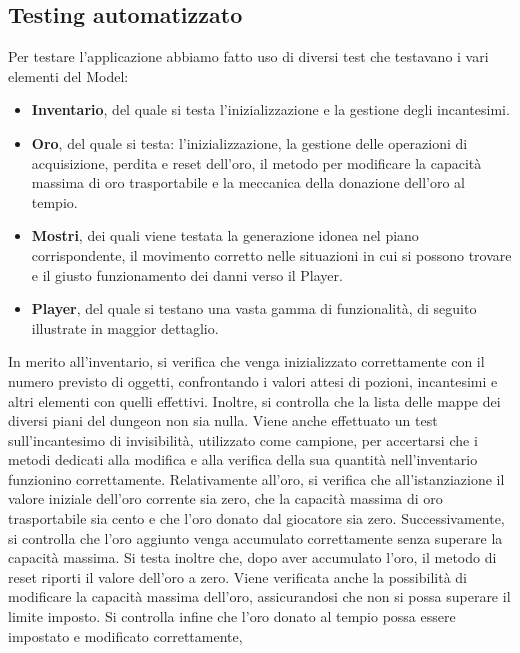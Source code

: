 \documentclass{report}
\begin{document}
\subsection{Testing automatizzato}
Per testare l'applicazione abbiamo fatto uso di diversi test che testavano i vari elementi del Model:
\begin{itemize}
    \item \textbf{Inventario}, del quale si testa l’inizializzazione e la gestione degli incantesimi.
    \item \textbf{Oro}, del quale si testa: l’inizializzazione, la gestione delle operazioni di acquisizione, perdita e reset dell’oro, il metodo per modificare la capacità massima di oro trasportabile e la meccanica della donazione dell’oro al tempio.
    \item \textbf{Mostri}, dei quali viene testata la generazione idonea nel piano corrispondente, il movimento corretto nelle situazioni in cui si possono trovare e il giusto funzionamento dei danni verso il Player.
    \item \textbf{Player}, del quale si testano una vasta gamma di funzionalità, di seguito illustrate in maggior dettaglio.
\end{itemize} 
%
In merito all'inventario, si verifica che venga inizializzato correttamente con il numero previsto di oggetti, confrontando i valori attesi di pozioni, incantesimi e altri elementi con quelli effettivi. Inoltre, si controlla che 
%
la lista delle mappe dei diversi piani del dungeon non sia nulla. \newline
%
Viene anche effettuato un test sull’incantesimo di invisibilità, utilizzato come campione, per accertarsi che i metodi dedicati alla modifica e alla verifica della sua quantità nell’inventario funzionino correttamente. \newline
%
Relativamente all’oro, si verifica che all’istanziazione il valore iniziale dell’oro corrente sia zero, che la capacità massima di oro trasportabile sia cento e che l’oro donato dal giocatore sia zero. Successivamente, 
%
si controlla che l’oro aggiunto venga accumulato correttamente senza superare la capacità massima. Si testa inoltre che, dopo aver accumulato l’oro, il metodo di reset riporti il valore dell’oro a zero. \newline
%
Viene verificata anche la possibilità di modificare la capacità massima dell’oro, assicurandosi che non si possa superare il limite imposto. Si controlla infine che l’oro donato al tempio possa essere impostato e modificato correttamente,
\end{document}
